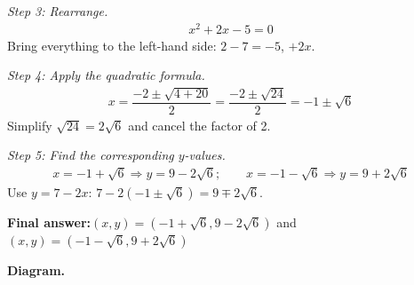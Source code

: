 \documentclass[11pt]{article}
\begin{document}
\textit{Step 3: Rearrange.}
\[\begin{gathered}
x^2 + 2x - 5 = 0
\end{gathered}\]
Bring everything to the left-hand side: \( 2 - 7 = -5 \), \( +2x \).

\textit{Step 4: Apply the quadratic formula.}
\[\begin{gathered}
x = \dfrac{-2 \pm \sqrt{4 + 20}}{2} = \dfrac{-2 \pm \sqrt{24}}{2} = -1 \pm \sqrt{6}
\end{gathered}\]
Simplify \( \sqrt{24} = 2\sqrt{6} \) and cancel the factor of 2.

\textit{Step 5: Find the corresponding \( y \)-values.}
\[\begin{gathered}
x = -1 + \sqrt{6} \Rightarrow y = 9 - 2\sqrt{6}; \qquad x = -1 - \sqrt{6} \Rightarrow y = 9 + 2\sqrt{6}
\end{gathered}\]
Use \( y = 7 - 2x \): \( 7 - 2(-1 \pm \sqrt{6}) = 9 \mp 2\sqrt{6} \).

\begin{answerbox}
\textbf{Final answer:}\quad \(\displaystyle (x, y) = (-1 + \sqrt{6}, 9 - 2\sqrt{6})\) and \(\displaystyle (x, y) = (-1 - \sqrt{6}, 9 + 2\sqrt{6})\)
\end{answerbox}
\textbf{Diagram.}
\end{document}
